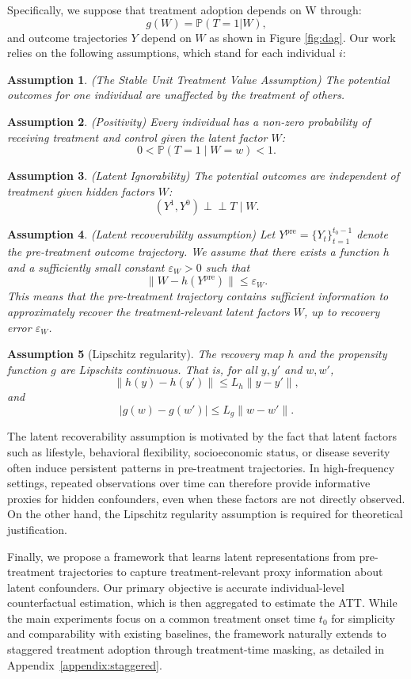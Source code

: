 \documentclass[10pt]{article} %
\newtheorem{assumption}{Assumption}
\begin{document}
{Specifically, we suppose that treatment adoption depends on W through: $$g(W) = \mathbb P(T=1|W),$$ and outcome trajectories $Y$ depend on $W$ as shown in Figure \ref{fig:dag}. Our work relies on the  following assumptions, which stand for each individual $i$:
\begin{assumption} (The Stable Unit Treatment Value
Assumption) The potential outcomes for one individual are unaffected by the treatment of others. \end{assumption}
\begin{assumption} (Positivity) Every individual has a non-zero probability of receiving treatment and control given the latent factor $W$: $$0 < \mathbb P(T=1 \mid W=w) < 1.$$ \end{assumption}
\begin{assumption} (Latent Ignorability) The potential outcomes are independent of treatment given hidden factors $W$:$$(Y^1, Y^0) \perp\!\!\!\perp T \mid  W.$$\end{assumption}}
{
\begin{assumption}(Latent recoverability assumption)
Let
$
Y^{\mathrm{pre}} = \{Y_t\}_{t=1}^{t_0-1}
$
denote the pre-treatment outcome trajectory. We assume that there exists a function \(h\) and a sufficiently small constant \(\varepsilon_W > 0\) such that
\[
\|W - h(Y^{\mathrm{pre}})\| \leq \varepsilon_W .
\]
This means that the pre-treatment trajectory contains sufficient information to approximately recover the treatment-relevant latent factors \(W\), up to recovery error \(\varepsilon_W\).
\end{assumption}
}
{\begin{assumption}[Lipschitz regularity]
The recovery map \(h\) and the propensity function \(g\) are Lipschitz continuous. That is, for all \(y,y'\) and \(w,w'\),
\[
\|h(y)-h(y')\| \leq L_h \|y-y'\|,
\]
and
\[
|g(w)-g(w')| \leq L_g \|w-w'\|.
\]
\end{assumption}}
{The latent recoverability assumption is motivated by the fact that latent factors such as lifestyle, behavioral flexibility, socioeconomic status, or disease severity often induce persistent patterns in pre-treatment trajectories. In high-frequency settings, repeated observations over time can therefore provide informative proxies for hidden confounders, even when these factors are not directly observed. On the other hand, the Lipschitz regularity assumption is required for theoretical justification.
}

 {{
Finally, we propose a framework that learns latent representations from pre-treatment trajectories to capture treatment-relevant proxy information about latent confounders. Our primary objective is accurate individual-level counterfactual estimation, which is then aggregated to estimate the ATT. While the main experiments focus on a common treatment onset time $t_0$ for simplicity and comparability with existing baselines, the framework naturally extends to staggered treatment adoption through treatment-time masking, as detailed in Appendix~\ref{appendix:staggered}.
}}
\end{document}

